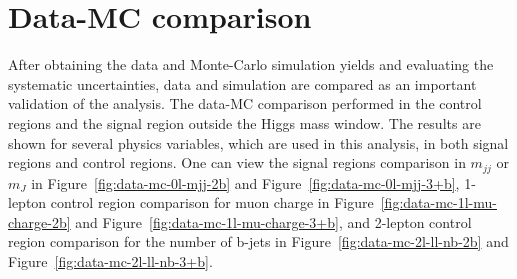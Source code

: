 



\section{Data-MC comparison}

\par After obtaining the data and Monte-Carlo simulation yields and evaluating the systematic uncertainties, data and simulation are compared as an important validation of the analysis. 
The data-MC comparison performed in the control regions and the signal region outside the Higgs mass window. 
The results are shown for several physics variables, which are used in this analysis, in both signal regions and control regions. 
One can view the signal regions comparison in $m_{jj}$ or $m_{J}$ in Figure~\ref{fig:data-mc-0l-mjj-2b} and Figure~\ref{fig:data-mc-0l-mjj-3+b}, 1-lepton control region comparison for muon charge in Figure~\ref{fig:data-mc-1l-mu-charge-2b} and Figure~\ref{fig:data-mc-1l-mu-charge-3+b}, and 2-lepton control region comparison for the number of b-jets in Figure~\ref{fig:data-mc-2l-ll-nb-2b} and Figure~\ref{fig:data-mc-2l-ll-nb-3+b}.

